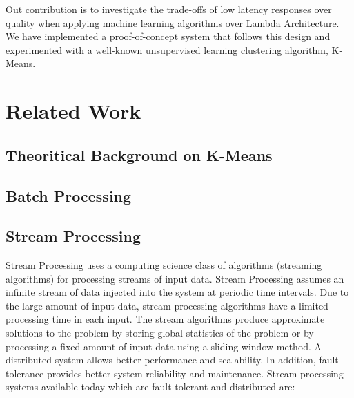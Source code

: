 \documentclass{lmproj}
\begin{document}
Out contribution is to investigate the trade-offs of low latency responses over quality when applying machine learning algorithms over Lambda Architecture. We have implemented a proof-of-concept system that follows this design and experimented with a well-known unsupervised learning clustering algorithm, K-Means. 


\chapter{Related Work}
\label{relatedwork}

\section{Theoritical Background on K-Means}
\label{relatedwork}



\section{Batch Processing}
\label{relatedwork}

\section{Stream Processing}
\label{relatedwork}

Stream Processing uses a computing science class of algorithms (streaming algorithms) for processing streams of input data. Stream Processing assumes an infinite stream of data injected into the system at periodic time intervals. Due to the large amount of input data, stream processing algorithms have a limited processing time in each input.  The stream algorithms produce approximate solutions to the problem by storing global statistics of the problem or by processing a fixed amount of input data using a sliding window method.
A distributed system allows better performance and scalability. In addition, fault tolerance provides better system reliability and maintenance. Stream processing systems available today which are fault tolerant and distributed are:
\end{document}
